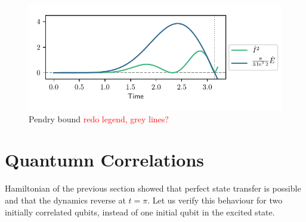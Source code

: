 \documentclass{book}
\numberwithin{equation}{section} %
\begin{document}
\begin{figure}[h!]
    \centering
    \includegraphics{alltheplots/j_var/pendry_grey_lines_fixed_legend.pdf}
    \caption{Pendry bound \textcolor{red}{redo legend, grey lines?}\cite{BA_Pendry_1983}}
    \label{fig:perf_pendry}
\end{figure}
\section{Quantumn Correlations}
Hamiltonian of the previous section showed that perfect state transfer is possible and that the dynamics reverse at $t=\pi$. Let us
verify this behaviour for two initially correlated qubits, instead of one initial qubit in the excited state.
\end{document}
